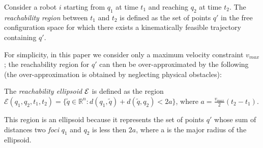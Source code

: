 \documentclass[10pt,twocolumn,twoside]{IEEEtran}
\newcommand{\new}[1]{\textcolor{blue}{#1}}
\newcommand{\news}{\color{blue}}
\begin{document}
{\news
\begin{definition}\label{sec:ellipsoidal definition}
Consider a robot $i$ starting from $q_{1}$ at time $t_1$ and reaching $q_{2}$ at time $t_2$. The \emph{reachability region} between $t_1$ and $t_2$ is defined as the set of points $q'$ in the free configuration space for which there exists a kinematically feasible trajectory containing $q'$.
\end{definition}

For simplicity, in this paper we consider only a maximum velocity constraint $v_{max}$; the reachability region for $q'$ can then be over-approximated by the following (the over-approximation is obtained by neglecting physical obstacles):%
\begin{definition}\label{def:Reachability}
	The \emph{reachability ellipsoid $\mathcal{E}$} is defined as the region $\mathcal{E}(q_1,q_2,t_{1},t_{2})=\{\tilde{q}\in\mathbb{R}^n: d(q_1,\tilde{q})+d(\tilde{q},q_2)<2a\}$, where $a=\frac{v_{max}}{2}(t_2-t_1)$.
\end{definition}
This region is an ellipsoid because it represents the set of points $q'$ whose sum of distances two \emph{foci} $q_1$ and $q_2$ is less then $2a$, where a is the major radius of the ellipsoid. }
\end{document}
